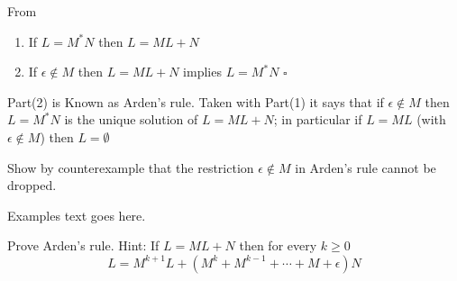 From \cite[p78]{Wonham2018}
\begin{proposition}
	\begin{enumerate}
		\item If $L = M^{\ast}N$ then $L = ML + N$
		\item If $\epsilon\notin M$ then $L = ML + N$ implies $L = M^{\ast}N$ \hfill$\square$
	\end{enumerate}
\end{proposition}
Part(2) is Known as Arden's rule. Taken with Part(1) it says that if $\epsilon\notin M$ then $L = M^{\ast}N$ is the unique solution of $L = ML + N$; in particular if $L = ML$ (with $\epsilon \notin M$) then $L = \emptyset$

\begin{exercise}
	Show by counterexample that the restriction $\epsilon \notin M$ in Arden's rule cannot be dropped.
\end{exercise}
\begin{solution}
	Examples text goes here.
\end{solution}

\begin{exercise}
	Prove Arden's rule. Hint: If $L = ML + N$ then for every $k\geq 0$
	$$L = M^{k+1}L + (M^{k} + M^{k-1} + \cdots + M + \epsilon)N$$
\end{exercise}

